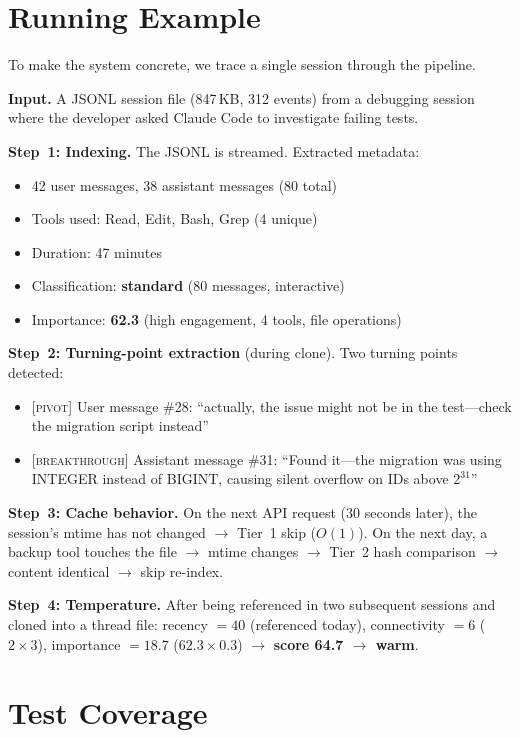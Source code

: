 \documentclass[11pt]{article}
\begin{document}
\section{Running Example}
\label{app:example}

To make the system concrete, we trace a single session through the pipeline.

\textbf{Input.} A JSONL session file (847\,KB, 312 events) from a debugging session where the developer asked Claude Code to investigate failing tests.

\textbf{Step~1: Indexing.} The JSONL is streamed. Extracted metadata:
\begin{itemize}[nosep]
  \item 42 user messages, 38 assistant messages (80 total)
  \item Tools used: Read, Edit, Bash, Grep (4 unique)
  \item Duration: 47 minutes
  \item Classification: \textbf{standard} (80 messages, interactive)
  \item Importance: \textbf{62.3} (high engagement, 4 tools, file operations)
\end{itemize}

\textbf{Step~2: Turning-point extraction} (during clone). Two turning points detected:
\begin{itemize}[nosep]
  \item \textsc{[pivot]} User message \#28: ``actually, the issue might not be in the test---check the migration script instead''
  \item \textsc{[breakthrough]} Assistant message \#31: ``Found it---the migration was using INTEGER instead of BIGINT, causing silent overflow on IDs above $2^{31}$''
\end{itemize}

\textbf{Step~3: Cache behavior.} On the next API request (30 seconds later), the session's mtime has not changed $\to$ Tier~1 skip ($O(1)$). On the next day, a backup tool touches the file $\to$ mtime changes $\to$ Tier~2 hash comparison $\to$ content identical $\to$ skip re-index.

\textbf{Step~4: Temperature.} After being referenced in two subsequent sessions and cloned into a thread file: recency $= 40$ (referenced today), connectivity $= 6$ ($2 \times 3$), importance $= 18.7$ ($62.3 \times 0.3$) $\to$ \textbf{score 64.7 $\to$ warm}.

\section{Test Coverage}
\label{app:tests}
\end{document}
